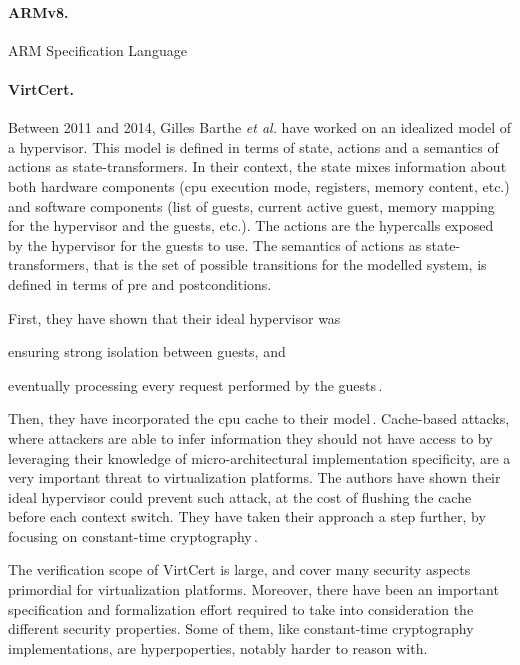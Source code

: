 \paragraph{ARMv8.}
%
ARM Specification Language

\paragraph{VirtCert.}
%
Between 2011 and 2014, Gilles Barthe \emph{et al.} have worked on an idealized
model of a hypervisor.
%
This model is defined in terms of state, actions and a semantics of actions as
state-trans\-formers.
%
In their context, the state mixes information about both hardware components
(\ac{cpu} execution mode, registers, memory content, etc.) and software
components (list of guests, current active guest, memory mapping for the
hypervisor and the guests, etc.).
%
The actions are the hypercalls exposed by the hypervisor for the guests to use.
%
The semantics of actions as state-transformers, that is the set of possible
transitions for the modelled system, is defined in terms of pre and
postconditions.

First, they have shown that their ideal hypervisor was
%
\begin{inparaenum}[(1)]
\item ensuring strong isolation between guests, and
%
\item eventually processing every request performed by the
  guests\,\cite{barthe2011virtcert1}.
\end{inparaenum}
%
Then, they have incorporated the \ac{cpu} cache to their
model\,\cite{barthe2012virtcert2}.
%
Cache-based attacks, where attackers are able to infer information they should
not have access to by leveraging their knowledge of micro-architectural
implementation specificity, are a very important threat to virtualization
platforms.
%
The authors have shown their ideal hypervisor could prevent such attack, at the
cost of flushing the cache before each context switch.
%
They have taken their approach a step further, by focusing on constant-time
cryptography\,\cite{barthe2014virtcert3}.

The verification scope of VirtCert is large, and cover many security aspects
primordial for virtualization platforms.
%
Moreover, there have been an important specification and formalization effort
required to take into consideration the different security properties.
%
Some of them, like constant-time cryptography implementations, are
hyperpoperties, notably harder to reason with.

